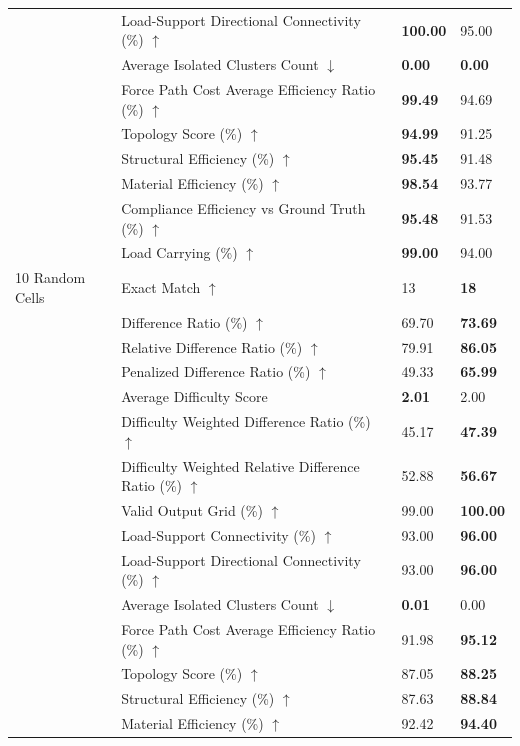 \begin{table}[!h]
{\begin{tabular}{llll}
 & Load-Support Directional Connectivity (\%) $\uparrow$ & \textbf{100.00} & 95.00 \\
 & Average Isolated Clusters Count $\downarrow$ & \textbf{0.00} & \textbf{0.00} \\
 & Force Path Cost Average Efficiency Ratio (\%) $\uparrow$ & \textbf{99.49} & 94.69 \\
 & Topology Score (\%) $\uparrow$ & \textbf{94.99} & 91.25 \\
 & Structural Efficiency (\%) $\uparrow$ & \textbf{95.45} & 91.48 \\
 & Material Efficiency (\%) $\uparrow$ & \textbf{98.54} & 93.77 \\
 & Compliance Efficiency vs Ground Truth (\%) $\uparrow$ & \textbf{95.48} & 91.53 \\
 & Load Carrying (\%) $\uparrow$ & \textbf{99.00} & 94.00 \\
10 Random Cells & Exact Match $\uparrow$ & 13 & \textbf{18} \\
 & Difference Ratio (\%) $\uparrow$ & 69.70 & \textbf{73.69} \\
 & Relative Difference Ratio (\%) $\uparrow$ & 79.91 & \textbf{86.05} \\
 & Penalized Difference Ratio (\%) $\uparrow$ & 49.33 & \textbf{65.99} \\
 & Average Difficulty Score & \textbf{2.01} & 2.00 \\
 & Difficulty Weighted Difference Ratio (\%) $\uparrow$ & 45.17 & \textbf{47.39} \\
 & Difficulty Weighted Relative Difference Ratio (\%) $\uparrow$ & 52.88 & \textbf{56.67} \\
 & Valid Output Grid (\%) $\uparrow$ & 99.00 & \textbf{100.00} \\
 & Load-Support Connectivity (\%) $\uparrow$ & 93.00 & \textbf{96.00} \\
 & Load-Support Directional Connectivity (\%) $\uparrow$ & 93.00 & \textbf{96.00} \\
 & Average Isolated Clusters Count $\downarrow$ & \textbf{0.01} & 0.00 \\
 & Force Path Cost Average Efficiency Ratio (\%) $\uparrow$ & 91.98 & \textbf{95.12} \\
 & Topology Score (\%) $\uparrow$ & 87.05 & \textbf{88.25} \\
 & Structural Efficiency (\%) $\uparrow$ & 87.63 & \textbf{88.84} \\
 & Material Efficiency (\%) $\uparrow$ & 92.42 & \textbf{94.40} \\

\end{tabular}}
\end{table}
